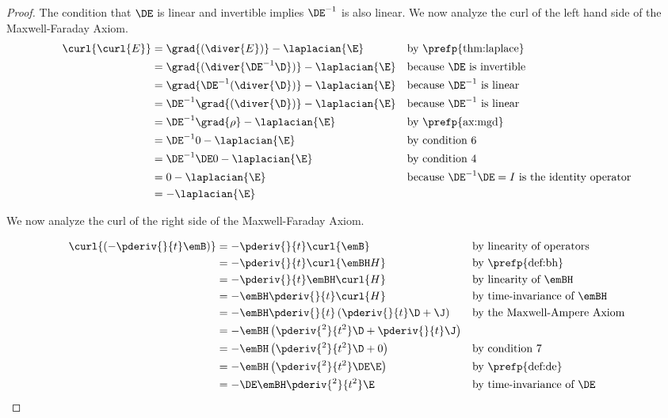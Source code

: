 \begin{proof}
The condition that $\DE$ is linear and invertible implies $\DE^{-1}$ is also linear.
We now analyze the curl of the left hand side of the Maxwell-Faraday Axiom.
\begin{align*}
   \curl{\curl{E}}
     &= \grad{(\diver{E})} - \laplacian{\E}
     && \text{by \prefp{thm:laplace}}
   \\&= \grad{(\diver{\DE^{-1}\D})} - \laplacian{\E}
     && \text{because $\DE$ is invertible}
   \\&= \grad{\DE^{-1}(\diver{\D})} - \laplacian{\E}
     && \text{because $\DE^{-1}$ is linear}
   \\&= \DE^{-1}\grad{(\diver{\D})} - \laplacian{\E}
     && \text{because $\DE^{-1}$ is linear}
   \\&= \DE^{-1}\grad{\rho} - \laplacian{\E}
     && \text{by \prefp{ax:mgd}}
   \\&= \DE^{-1}0 - \laplacian{\E}
     && \text{by condition 6}
   \\&= \DE^{-1}\DE 0 - \laplacian{\E}
     && \text{by condition 4}
   \\&= 0 - \laplacian{\E}
     && \text{because $\DE^{-1}\DE=I$ is the identity operator}
   \\ &= - \laplacian{\E}
\end{align*}


We now analyze the curl of the right side of the Maxwell-Faraday Axiom.


\begin{align*}
   \curl{\left( -\pderiv{}{t}\emB \right)}
     &= -\pderiv{}{t}\curl{\emB}
     && \text{by linearity of operators}
   \\&= -\pderiv{}{t}\curl{\emBH H}
     &&\text{by \prefp{def:bh}}
   \\&= -\pderiv{}{t}\emBH \curl{H}
     && \text{by linearity of $\emBH$}
   \\&= -\emBH \pderiv{}{t} \curl{H}
     && \text{by time-invariance of $\emBH$}
   \\&= -\emBH \pderiv{}{t} \left( \pderiv{}{t}\D + \J   \right)
     && \text{by the Maxwell-Ampere Axiom}
   \\&= -\emBH \left( \pderiv{^2}{t^2}\D + \pderiv{}{t}\J   \right)
   \\&= -\emBH \left( \pderiv{^2}{t^2}\D + 0  \right)
     && \text{by condition 7}
   \\&= -\emBH \left( \pderiv{^2}{t^2}\DE\E  \right)
     && \text{by \prefp{def:de}}
   \\&= -\DE \emBH \pderiv{^2}{t^2}\E
     && \text{by time-invariance of $\DE$ }
\end{align*}




\end{proof}
